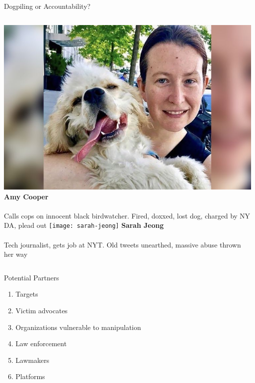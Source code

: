 \documentclass[nobackground,dvipsnames,table,aspectratio=169]{beamer}
\begin{document}
\begin{frame}{Dogpiling or Accountability?}
\begin{columns}[T]
            \includegraphics[trim=220 0 140 0, clip, height=0.3\textheight]{amy-cooper}
            \textbf{Amy Cooper}\\~\\
            Calls cops on innocent black birdwatcher. Fired, doxxed, lost dog, charged by NY DA, plead out
            \texttt{[image: sarah-jeong]}
            \textbf{Sarah Jeong}\\~\\
            Tech journalist, gets job at NYT. Old tweets unearthed, massive abuse thrown her way
    \end{columns}
\end{frame}

\begin{frame}{Potential Partners}
    \begin{enumerate}
        \item Targets
        \item Victim advocates
        \item Organizations vulnerable to manipulation
        \item Law enforcement
        \item Lawmakers
        \item Platforms
    \end{enumerate}
\end{frame}
\end{document}
